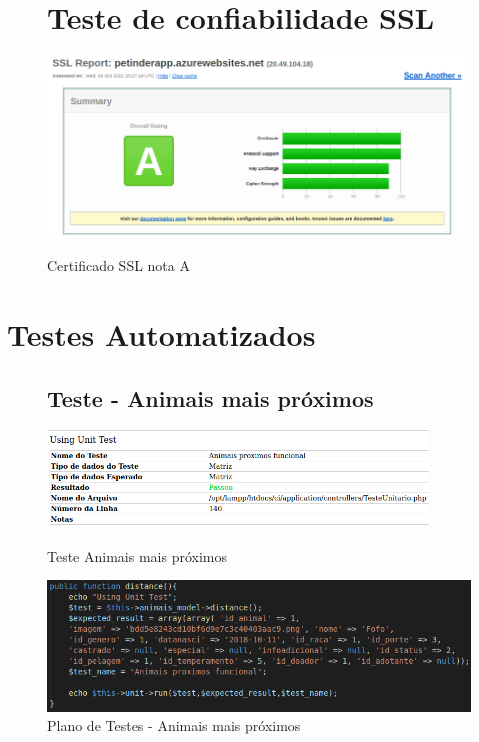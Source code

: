 \begin{apendicesenv}
\begin{figure}[htb]
\chapter{Teste de confiabilidade SSL}
\label{teste-ssl}
    \centering
    \caption{Certificado SSL nota A}
    \includegraphics[scale=0.65,angle=90]{imagens/certificado_ssl.png}
    \label{teste-ssl-img}
\end{figure}

\chapter{Testes Automatizados}
\label{testes}

\begin{figure}[!htbp]
\begin{flushleft}
    \section{Teste - Animais mais próximos}
\end{flushleft}
    \centering
    \caption{Teste Animais mais próximos}
    \includegraphics[width=0.9\textwidth,pagecommand=\chapter{}]{imagens/test_distancia.png}
    \label{teste-distancia}
\end{figure}

\begin{figure}[htb]
    \centering
    \caption{\label{fig_timeline}Plano de Testes - Animais mais próximos}
	\includegraphics[width=1\textwidth]{imagens/cod_teste_distance.png}
\end{figure}


\end{apendicesenv}
